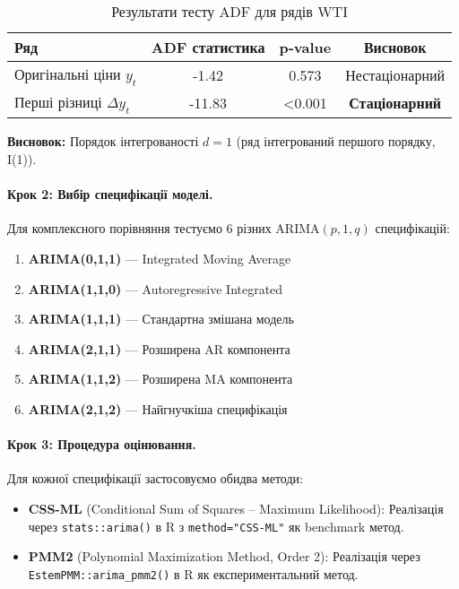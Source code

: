 \begin{table}[h]
\centering
\caption{Результати тесту ADF для рядів WTI}
\label{tab:wti_adf_test}
\begin{tabular}{lccc}
\toprule
\textbf{Ряд} & \textbf{ADF статистика} & \textbf{p-value} & \textbf{Висновок} \\
\midrule
Оригінальні ціни $y_t$ & -1.42 & 0.573 & Нестаціонарний \\
Перші різниці $\Delta y_t$ & -11.83 & <0.001 & \textbf{Стаціонарний} \\
\bottomrule
\end{tabular}
\end{table}

\noindent\textbf{Висновок:} Порядок інтегрованості $d=1$ (ряд інтегрований першого порядку, I(1)).

\paragraph{Крок 2: Вибір специфікації моделі.}
Для комплексного порівняння тестуємо 6 різних ARIMA$(p,1,q)$ специфікацій:

\begin{enumerate}
    \item \textbf{ARIMA(0,1,1)} --- Integrated Moving Average
    \item \textbf{ARIMA(1,1,0)} --- Autoregressive Integrated
    \item \textbf{ARIMA(1,1,1)} --- Стандартна змішана модель
    \item \textbf{ARIMA(2,1,1)} --- Розширена AR компонента
    \item \textbf{ARIMA(1,1,2)} --- Розширена MA компонента
    \item \textbf{ARIMA(2,1,2)} --- Найгнучкіша специфікація
\end{enumerate}

\paragraph{Крок 3: Процедура оцінювання.}
Для кожної специфікації застосовуємо обидва методи:

\begin{itemize}
    \item \textbf{CSS-ML} (Conditional Sum of Squares -- Maximum Likelihood): Реалізація через \texttt{stats::arima()} в R з \texttt{method="CSS-ML"} як benchmark метод.

    \item \textbf{PMM2} (Polynomial Maximization Method, Order 2): Реалізація через \texttt{EstemPMM::arima\_pmm2()} в R як експериментальний метод.
\end{itemize}

